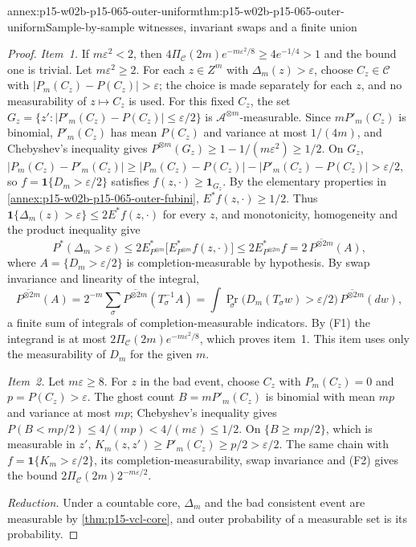 \begin{annexitem}{annex:p15-w02b-p15-065-outer-uniform}{thm:p15-w02b-p15-065-outer-uniform}{Sample-by-sample witnesses, invariant swaps and a finite union}
\begin{proof}
\emph{Item~1.} If \(m\varepsilon^2<2\), then
\(4\Pi_{\mathcal C}(2m)e^{-m\varepsilon^2/8}\geq4e^{-1/4}>1\) and the bound
one is trivial. Let \(m\varepsilon^2\geq2\). For each \(z\in Z^m\) with
\(\Delta_m(z)>\varepsilon\), choose \(C_z\in\mathcal C\) with
\(|P_m(C_z)-P(C_z)|>\varepsilon\); the choice is made separately for each
\(z\), and no measurability of \(z\mapsto C_z\) is used. For this fixed
\(C_z\), the set
\(G_z=\{z':|P'_m(C_z)-P(C_z)|\leq\varepsilon/2\}\) is
\(\mathcal A^{\otimes m}\)-measurable. Since \(mP'_m(C_z)\) is binomial,
\(P'_m(C_z)\) has mean \(P(C_z)\) and variance at most \(1/(4m)\), and Chebyshev's
inequality gives \(P^{\otimes m}(G_z)\geq1-1/(m\varepsilon^2)\geq1/2\). On
\(G_z\),
\(|P_m(C_z)-P'_m(C_z)|\geq|P_m(C_z)-P(C_z)|-|P'_m(C_z)-P(C_z)|>\varepsilon/2\),
so \(f=\mathbf1\{D_m>\varepsilon/2\}\) satisfies \(f(z,\cdot)\geq\mathbf1_{G_z}\).
By the elementary properties in
\cref{annex:p15-w02b-p15-065-outer-fubini},
\(E^{*}f(z,\cdot)\geq1/2\). Thus
\(\mathbf1\{\Delta_m(z)>\varepsilon\}\leq2E^{*}f(z,\cdot)\) for every \(z\),
and monotonicity, homogeneity and the product inequality give
\[
 P^{*}(\Delta_m>\varepsilon)\leq2E^{*}_{P^{\otimes m}}\bigl[E^{*}_{P^{\otimes m}}f(z,\cdot)\bigr]
 \leq2E^{*}_{P^{\otimes2m}}f=2\,\overline{P^{\otimes2m}}(A),
\]
where \(A=\{D_m>\varepsilon/2\}\) is completion-measurable by hypothesis.
By swap invariance and linearity of the integral,
\[
 \overline{P^{\otimes2m}}(A)=2^{-m}\sum_\sigma\overline{P^{\otimes2m}}(T_\sigma^{-1}A)
 =\int\Pr_\sigma\bigl(D_m(T_\sigma w)>\varepsilon/2\bigr)\,\overline{P^{\otimes2m}}(dw),
\]
a finite sum of integrals of completion-measurable indicators. By (F1) the
integrand is at most \(2\Pi_{\mathcal C}(2m)e^{-m\varepsilon^2/8}\), which
proves item~1. This item uses only the measurability of \(D_m\) for the
given \(m\).

\emph{Item~2.} Let \(m\varepsilon\geq8\). For \(z\) in the bad event, choose
\(C_z\) with \(P_m(C_z)=0\) and \(p=P(C_z)>\varepsilon\). The ghost count
\(B=mP'_m(C_z)\) is binomial with mean \(mp\) and variance at most \(mp\);
Chebyshev's inequality gives
\(P(B<mp/2)\leq4/(mp)<4/(m\varepsilon)\leq1/2\). On \(\{B\geq mp/2\}\),
which is measurable in \(z'\),
\(K_m(z,z')\geq P'_m(C_z)\geq p/2>\varepsilon/2\). The same chain with
\(f=\mathbf1\{K_m>\varepsilon/2\}\), its completion-measurability, swap
invariance and (F2) gives the bound \(2\Pi_{\mathcal C}(2m)2^{-m\varepsilon/2}\).

\emph{Reduction.} Under a countable core, \(\Delta_m\) and the bad
consistent event are measurable by \cref{thm:p15-vcl-core}, and outer
probability of a measurable set is its probability.
\end{proof}
\end{annexitem}

